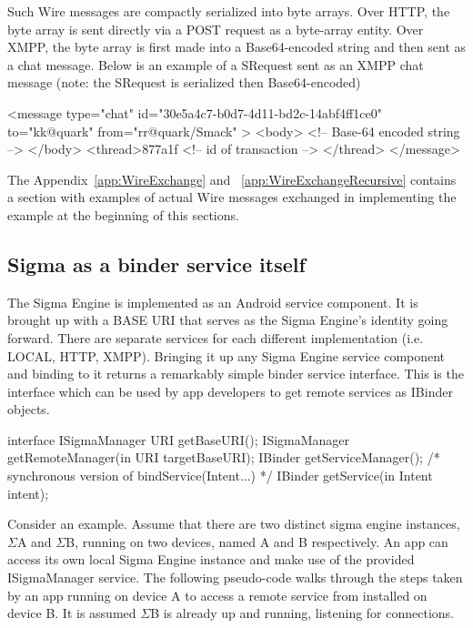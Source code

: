 \documentclass[prodmode]{acmlarge}
\begin{document}
Such Wire messages are compactly serialized into byte arrays. Over HTTP, the byte array is sent directly via a POST request as a byte-array entity. Over XMPP, the byte array is first made into a Base64-encoded string and then sent as a chat message. Below is an example of a SRequest sent as an XMPP chat message (note: the SRequest is serialized then Base64-encoded)

\begin{snippet}
<message type="chat" id="30e5a4c7-b0d7-4d11-bd2c-14abf4ff1ce0"
        to="kk@quark" from="rr@quark/Smack" >
        <body> <!-- Base-64 encoded string --> </body>
        <thread>877a1f <!-- id of transaction --> </thread>
        </message>
\end{snippet}

The Appendix~\ref{app:WireExchange} and ~\ref{app:WireExchangeRecursive} contains a section with examples of actual Wire messages exchanged in implementing the example at the beginning of this sections.

\subsection{Sigma as a binder service itself}
The Sigma Engine is implemented as an Android service component. It is brought up with a BASE URI that serves as the Sigma Engine's identity going forward. There are separate services for each different implementation (i.e. LOCAL, HTTP, XMPP). Bringing it up any Sigma Engine service component and binding to it returns a remarkably simple binder service interface. This is the interface which can be used by app developers to get remote services as IBinder objects.

\begin{snippet}
interface ISigmaManager {
    URI getBaseURI();
    ISigmaManager getRemoteManager(in URI targetBaseURI);
    IBinder getServiceManager();
    /* synchronous version of bindService(Intent...) */
    IBinder getService(in Intent intent);
}
\end{snippet}

Consider an example. Assume that there are two distinct sigma engine instances, $\Sigma$A and $\Sigma$B, running on two devices, named A and B respectively. An app can access its own local Sigma Engine instance and make use of the provided ISigmaManager service. The following pseudo-code walks through the steps taken by an app running on device A to access a remote service from installed on device B. It is assumed $\Sigma$B is already up and running, listening for connections.
\end{document}
